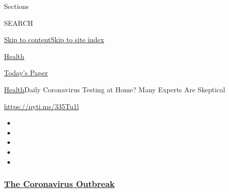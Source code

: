 Sections

SEARCH

\protect\hyperlink{site-content}{Skip to
content}\protect\hyperlink{site-index}{Skip to site index}

\href{https://www.nytimes3xbfgragh.onion/section/health}{Health}

\href{https://myaccount.nytimes3xbfgragh.onion/auth/login?response_type=cookie\&client_id=vi}{}

\href{https://www.nytimes3xbfgragh.onion/section/todayspaper}{Today's
Paper}

\href{/section/health}{Health}\textbar{}Daily Coronavirus Testing at
Home? Many Experts Are Skeptical

\url{https://nyti.ms/335Tu1l}

\begin{itemize}
\item
\item
\item
\item
\item
\end{itemize}

\hypertarget{the-coronavirus-outbreak}{%
\subsubsection{\texorpdfstring{\href{https://www.nytimes3xbfgragh.onion/news-event/coronavirus?name=styln-coronavirus-national\&region=TOP_BANNER\&block=storyline_menu_recirc\&action=click\&pgtype=Article\&impression_id=acf11f50-f4b6-11ea-bb95-3783730020e3\&variant=undefined}{The
Coronavirus
Outbreak}}{The Coronavirus Outbreak}}\label{the-coronavirus-outbreak}}

